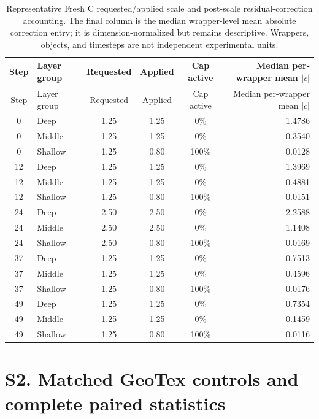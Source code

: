 \documentclass[11pt]{article}
\begin{document}
\begingroup\scriptsize
\begin{longtable}{c l c c c r}
\caption{Representative Fresh C requested/applied scale and post-scale residual-correction accounting. The final column is the median wrapper-level mean absolute correction entry; it is dimension-normalized but remains descriptive. Wrappers, objects, and timesteps are not independent experimental units.}\label{tab:supp-execution}\\
\toprule Step & Layer group & Requested & Applied & Cap active & Median per-wrapper mean $|c|$ \\
\midrule\endfirsthead
\toprule Step & Layer group & Requested & Applied & Cap active & Median per-wrapper mean $|c|$ \\
\midrule\endhead
0 & Deep & 1.25 & 1.25 & 0\% & 1.4786 \\
0 & Middle & 1.25 & 1.25 & 0\% & 0.3540 \\
0 & Shallow & 1.25 & 0.80 & 100\% & 0.0128 \\
12 & Deep & 1.25 & 1.25 & 0\% & 1.3969 \\
12 & Middle & 1.25 & 1.25 & 0\% & 0.4881 \\
12 & Shallow & 1.25 & 0.80 & 100\% & 0.0151 \\
24 & Deep & 2.50 & 2.50 & 0\% & 2.2588 \\
24 & Middle & 2.50 & 2.50 & 0\% & 1.1408 \\
24 & Shallow & 2.50 & 0.80 & 100\% & 0.0169 \\
37 & Deep & 1.25 & 1.25 & 0\% & 0.7513 \\
37 & Middle & 1.25 & 1.25 & 0\% & 0.4596 \\
37 & Shallow & 1.25 & 0.80 & 100\% & 0.0176 \\
49 & Deep & 1.25 & 1.25 & 0\% & 0.7354 \\
49 & Middle & 1.25 & 1.25 & 0\% & 0.1459 \\
49 & Shallow & 1.25 & 0.80 & 100\% & 0.0116 \\
\bottomrule
\end{longtable}

\endgroup

\FloatBarrier
\section*{S2. Matched GeoTex controls and complete paired statistics}
\label{supp:group2}
\end{document}
